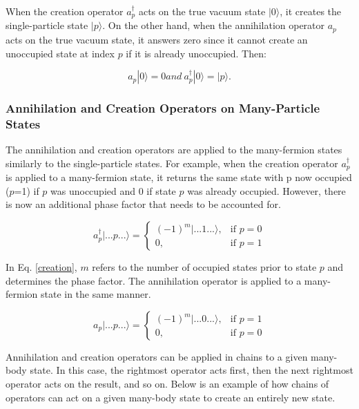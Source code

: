 	When the creation operator $a^\dagger_p$ acts on the true vacuum state $|0\rangle$, it creates the single-particle state $|p\rangle$. On the other hand, when the annihilation operator $a_p$ acts on the true vacuum state, it answers zero since it cannot create an unoccupied state at index $p$ if it is already unoccupied. Then:

	\begin{equation}
		a_p|0\rangle = 0
   and \ a^\dagger_p|0\rangle = |p\rangle.
	\end{equation}

	\subsubsection*{Annihilation and Creation Operators on Many-Particle States}

	The annihilation and creation operators are applied to the many-fermion states similarly to the single-particle states. For example, when the creation operator $a^\dagger_p$ is applied to a many-fermion state, it returns the same state with p now occupied ($p$=1) if $p$ was unoccupied and 0 if state $p$ was already occupied. However, there is now an additional phase factor that needs to be accounted for.

	\begin{equation}\label{creation}
		a^\dagger_p|...p...\rangle = \begin{cases}
    									(-1)^m|...1...\rangle,& \text{if } p = 0\\
           								0,& \text{if } p = 1
									\end{cases}
	\end{equation}

	In Eq. \ref{creation}, $m$ refers to the number of occupied states prior to state $p$ and determines the phase factor. The annihilation operator is applied to a many-fermion state in the same manner.

	\begin{equation}
		a_p|...p...\rangle = \begin{cases}
    									(-1)^m|...0...\rangle,& \text{if } p = 1\\
           								0,& \text{if } p = 0
								\end{cases}
	\end{equation}

	Annihilation and creation operators can be applied in chains to a given many-body state. In this case, the rightmost operator acts first, then the next rightmost operator acts on the result, and so on. Below is an example of how chains of operators can act on a given many-body state to create an entirely new state.

